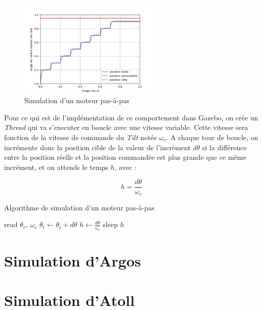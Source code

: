 				\begin{figure}[!htb]
					\centering
					\includegraphics[width=0.6\textwidth]{imgs/stepper_motor.png}
					\caption{Simulation d'un moteur pas-à-pas}
					\label{fig:tilt_position}
				\end{figure}
				
				Pour ce qui est de l'implémentation de ce comportement dans \gls{Gazebo}, on crée un \textit{Thread} qui va s'executer en boucle avec une vitesse variable. Cette vitesse sera fonction de la vitesse de commande du \textit{Tilt} notée $\omega_c$. A chaque tour de boucle, on incrémente donc la position cible de la valeur de l'incrément $d\theta$ si la différence entre la position réelle et la position commandée est plus grande que ce même incrément, et on attends le temps $h$, avec :

				$$h = \frac{d\theta}{\omega_c}$$

				\begin{algorithm}[!htb]
					\caption{Algorithme de simulation d'un moteur pas-à-pas}
					\label{algo:stepper_motor}
					\begin{algorithmic}
							\STATE read $\theta_r$, $\omega_c$
								\STATE $\theta_t \leftarrow \theta_t + d\theta$
							\ENDIF
							\STATE $h \leftarrow \frac{d\theta}{\omega_c}$
							\STATE sleep $h$
						\ENDWHILE
					\end{algorithmic}
				\end{algorithm}
				

	\section{Simulation d'Argos}

	\section{Simulation d'Atoll}